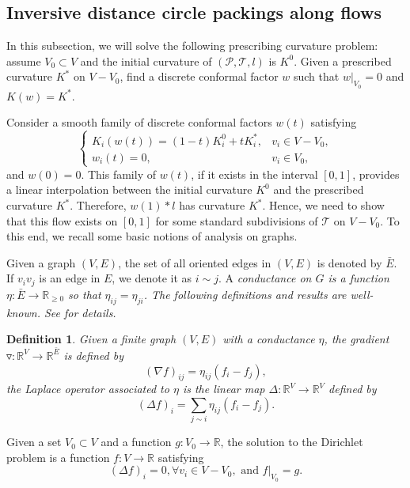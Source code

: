 \documentclass[12pt]{amsart}
\newtheorem{definition}[theorem]{Definition}
\def\R{\mathbb{R}}
\begin{document}
\subsection{Inversive distance circle packings along flows}
In this subsection, we will solve the following prescribing curvature problem: assume $V_0\subset V$ and the initial curvature of $(\mathcal{P},\mathcal{T}, l)$ is $K^0$. Given a prescribed curvature $K^*$ on $V - V_0$, find a discrete conformal factor $w$ such that $w|_{V_0} = 0$ and $K(w) = K^*$.


Consider a smooth family of discrete conformal factors $w(t)$ satisfying
    \begin{equation}
    \label{flow}
    \left\{ {\begin{array}{lr}
    		{K_i}(w(t)) = (1 - t)K_i^0 + tK_i^*,&v_i \in V - {V_0},\\
    		{w_i}(t) = 0, &v_i \in {V_0},
    \end{array}} \right.\end{equation}
and $w(0) = 0$. This family of $w(t)$, if it exists in the interval $[0,1]$, provides a linear interpolation between the initial curvature $K^0$ and the prescribed curvature $K^*$. Therefore, $w(1)*l$ has curvature $K^*$. Hence, we need to show that this flow exists on $[0,1]$ for some standard subdivisions of $\mathcal{T}$ on $V - {V_0}$. To this end, we recall some basic notions of analysis on graphs.

    Given a graph $(V, E)$,  the set of all oriented edges in $(V,E)$
is denoted  by $\bar{E}$. If $v_iv_j$ is an edge in $E$, we denote it as $i\sim j$. A \it conductance \rm on $G$ is a function $\eta: \bar{E} \to \R_{\geq 0}$ so that $\eta_{ij}=\eta_{ji}$. The following definitions and results are well-known. See \cite{Lov} for details.

\begin{definition} \label{definition lap} Given a finite graph $(V,E)$ with a conductance $\eta$,
	the   gradient  $\triangledown: \R^V \to \R^{\bar{E}}$ is defined by $$ (\nabla f)_{ij} =\eta_{ij}(f_i-f_j),$$
	the  Laplace operator  associated to $\eta$ is the linear map
	$\Delta: \R^V \to \R^V$ defined by
	$$ (\Delta f)_i =\sum_{j \sim i}
	\eta_{ij}(f_i-f_j).$$
\end{definition}

	Given a set $V_0\subset V$ and a function $g: V_0\to \mathbb{R}$, the solution to the Dirichlet problem is a function $f:V\to\mathbb{R}$ satisfying
	$$(\Delta f)_i = 0, \forall v_i\in V-V_0, \text{ and } f|_{V_0} = g.$$
\end{document}

